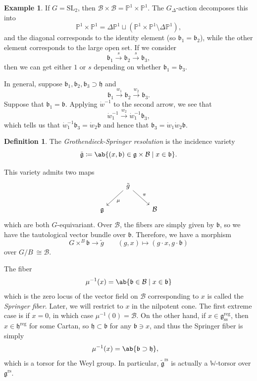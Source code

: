 \documentclass{amsart}
\theoremstyle{definition}
\newtheorem{defn}[thm]{Definition}
\newtheorem{exm}[thm]{Example}
\theoremstyle{remark}
\theoremstyle{plain}
\theoremstyle{definition}
\theoremstyle{remark}
\renewcommand{\P}{\mathbb{P}}
\newcommand{\g}{\mathfrak{g}}
\newcommand{\h}{\mathfrak{h}}
\renewcommand{\b}{\mathfrak{b}}
\newcommand{\mc}[1]{\mathcal{#1}}
\newcommand{\mbb}[1]{\mathbb{#1}}
\newcommand{\mr}[1]{\mathrm{#1}}
\newcommand{\on}[1]{\operatorname{#1}}
\newcommand{\1}{\mathbf{1}}
\newcommand{\2}{\mathbf{2}}
\newcommand{\3}{\mathbf{3}}
\newcommand{\SL}{\mr{SL}}
\begin{document}
\begin{exm}
    If \(G = \SL_2\), then \(\mc{B} \times \mc{B} = \P^1 \times \P^1\). The \(G_{\Delta}\)-action decomposes this into
    \[ \P^1 \times \P^1 = \Delta \P^1 \sqcup (\P^1 \times \P^1 \setminus \Delta \P^1), \]
    and the diagonal corresponds to the identity element (so \(\b_1 = \b_2\)), while the other element corresponds to the large open set. If we consider
    \[ \b_1 \xrightarrow{s} \b_2 \xrightarrow{s} \b_3, \]
    then we can get either \(1\) or \(s\) depending on whether \(\b_1 = \b_3\).
\end{exm}

In general, suppose \(\b_1, \b_2, \b_3 \supset \h\) and 
\[ \b_1 \xrightarrow{w_1} \b_2 \xrightarrow{w_2} \b_3. \]
Suppose that \(\b_1 = \b\). Applying \(\dot{w}^{-1}\) to the second arrow, we see that
\[ \dot{w}_1^{-1} \xrightarrow{w_2} \dot{w}_1^{-1} \b_3, \]
which tells us that \(\dot{w}_1^{-1} \b_3 = \dot{w}_2 \b\) and hence that \(\b_3 = \dot{w}_1 \dot{w}_2 \b\).

\begin{defn}
    The \textit{Grothendieck-Springer resolution} is the incidence variety
    \[ \tilde{\g} \coloneqq \ab\{ (x, \b) \in \g \times \mc{B} \mid x \in \b \}. \]
\end{defn}

This variety admits two maps
\begin{equation*}
\begin{tikzcd}
    & \tilde{g} \ar{dl}{\mu} \ar{dr}{\pi} \\
    \g & & \mc{B}
\end{tikzcd}
\end{equation*}
which are both \(G\)-equivariant. Over \(\mc{B}\), the fibers are simply given by \(\b\), so we have the tautological vector bundle over \(\b\). Therefore, we have a morphism
\[ G \times^B \b \to \tilde{g} \qquad (g, x) \mapsto (g \cdot x, g \cdot \b) \]
over \(G/B\ \cong \mc{B}\). 

The fiber
\[ \mu^{-1}(x) = \ab\{ \b \in \mc{B} \mid x \in \b \} \]
which is the zero locus of the vector field on \(\mc{B}\) corresponding to \(x\) is called the \textit{Springer fiber}. Later, we will restrict to \(x\) in the nilpotent cone. The first extreme case is if \(x = 0\), in which case \(\mu^{-1}(0) = \mc{B}\). On the other hand, if \(x \in \g_{\mr{ss}}^{\on{reg}}\), then \(x \in \h^{\on{reg}}\) for some Cartan, so \(\h \subset \b\) for any \(\b \ni x\), and thus the Springer fiber is simply 
\begin{align*}
    \mu^{-1}(x) &= \ab\{\b \supset \h \},
\end{align*}
which is a torsor for the Weyl group. In particular, \(\tilde{\g}^{\on{rs}}\) is actually a \(\mbb{W}\)-torsor over \(\g^{\on{rs}}\).
\end{document}
